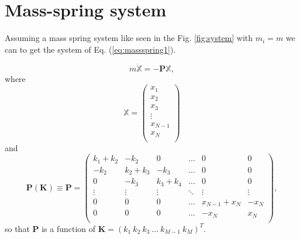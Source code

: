 \documentclass[review]{elsarticle}
\begin{document}
\section{Mass-spring system}
Assuming a mass spring system like seen in the Fig. \ref{fig:system} with $m_i=m$
we can to get the system of Eq. (\ref{eq:massspring1}).

\begin{equation}\label{eq:massspring1}
 m \mathbb{\ddot{X}} = -\mathbf{P} \mathbb{X},
\end{equation}
where
\begin{equation}\label{eq:X}
 \mathbb{X} = \left( 
 \begin{matrix}
 x_1\\
 x_2\\ 
 x_3\\ 
 \vdots \\
 x_{N-1}\\
 x_N\\
 \end{matrix}
\right)
\end{equation}
and 
\begin{equation}\label{eq:P}
 \mathbf{P}(\mathbf{K}) \equiv \mathbf{P} = \left( 
 \begin{matrix}
 k_1+k_2 & -k_2    & 0       &  \hdots & 0           & 0  \\
 -k_2    & k_2+k_3 & -k_3    &  \hdots & 0           & 0  \\
 0       &    -k_3 & k_3+k_4 &  \hdots & 0           & 0  \\
 \vdots  & \vdots  & \vdots  &  \ddots & \vdots      & \vdots \\
 0       & 0       & 0       &  \hdots & x_{N-1}+x_N & -x_N  \\
 0       & 0       & 0       &  \hdots & -x_N        & x_N  \\
 \end{matrix}
\right),
\end{equation}
so that $\mathbf{P}$ is a function of $\mathbf{K}=( k_1~ k_2~ k_3~ \hdots ~ k_{M-1}~ k_M)^{T}$.


\end{document}
